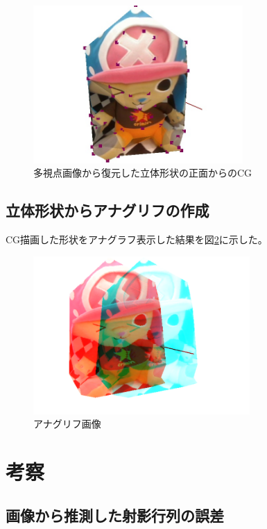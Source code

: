 \documentclass[11pt,a4j]{jsarticle}
\makeatletter
\newcommand{\figcaption}[1]{\def\@captype{figure}\caption{#1}}
\makeatother
\begin{document}
\begin{figure}[H]
  \centering
  \includegraphics[height=60mm,bb=0 0 644 483]{image/task2.jpg}
  \figcaption{多視点画像から復元した立体形状の正面からのCG}
  \label{fig:capture}
\end{figure}



\subsection{立体形状からアナグリフの作成}
\label{sub:result_anaglyph}

CG描画した形状をアナグラフ表示した結果を図\ref{fig:anaglyph}に示した。


\begin{figure}[H]
  \centering
  \includegraphics[height=60mm,bb=0 0 735 535]{image/ana.png}
  \figcaption{アナグリフ画像}
  \label{fig:anaglyph}
\end{figure}


\section{考察}
\label{sec:考察}

\subsection{画像から推測した射影行列の誤差}
\label{sub:画像から推測した射影行列の誤差}
\end{document}
